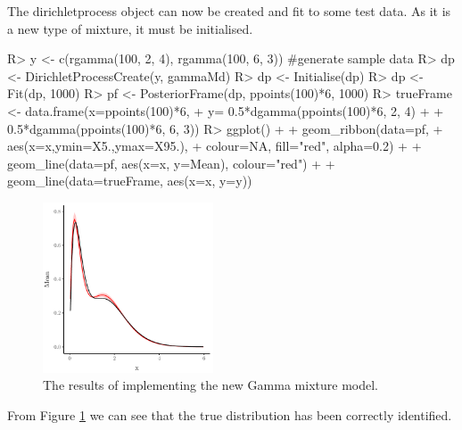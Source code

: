 \documentclass[nojss]{jss}
\begin{document}
The dirichletprocess object can now be created and fit to some test data. As it is a new type of mixture, it must be initialised.
\begin{Schunk}
\begin{Sinput}
R> y <- c(rgamma(100, 2, 4), rgamma(100, 6, 3)) #generate sample data
R> dp <- DirichletProcessCreate(y, gammaMd)
R> dp <- Initialise(dp)
R> dp <- Fit(dp, 1000)
R> pf <- PosteriorFrame(dp, ppoints(100)*6, 1000)
R> trueFrame <- data.frame(x=ppoints(100)*6,
+                            y= 0.5*dgamma(ppoints(100)*6, 2, 4) +
+                            0.5*dgamma(ppoints(100)*6, 6, 3))
R> ggplot() +
+    geom_ribbon(data=pf,
+                aes(x=x,ymin=X5.,ymax=X95.),
+                colour=NA, fill="red", alpha=0.2) +
+    geom_line(data=pf, aes(x=x, y=Mean), colour="red") +
+    geom_line(data=trueFrame, aes(x=x, y=y))
\end{Sinput}
\end{Schunk}
\begin{figure}[tb]
\centering
	\includegraphics[width=0.45\textwidth]{img/gamma_mixture_plot.pdf}
\caption{The results of implementing the new Gamma mixture model.}
\label{fig:gammamixture}
\end{figure}
From Figure \ref{fig:gammamixture} we can see that the true distribution has been correctly identified.

\end{document}

